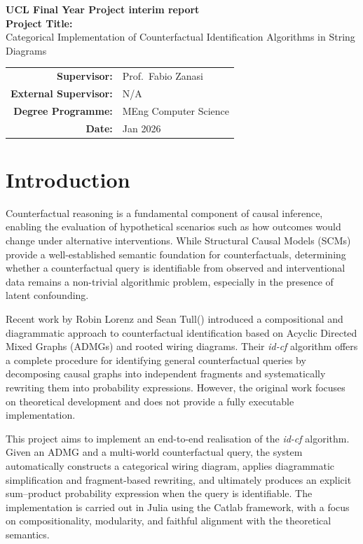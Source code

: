 \documentclass[12pt,a4paper]{article}
\begin{document}
\begin{center}
    \vspace*{1cm}
    {\LARGE \textbf{UCL Final Year Project interim report}}\\[1.5em]
    {\Large \textbf{Project Title:}}\\[0.5em]
    {\large Categorical Implementation of Counterfactual Identification Algorithms in String Diagrams}\\[2em]
    \begin{tabular}{rl}
        
        \textbf{Supervisor:} & Prof.\ Fabio Zanasi \\
        \textbf{External Supervisor:} & N/A \\
        \textbf{Degree Programme:} & MEng Computer Science \\
        \textbf{Date:} & Jan 2026 \\
    \end{tabular}
\end{center}


\newpage
\section{Introduction}

Counterfactual reasoning is a fundamental component of causal inference, enabling the evaluation of hypothetical scenarios such as how outcomes would change under alternative 
interventions. 
While Structural Causal Models (SCMs) provide a well-established semantic foundation for 
counterfactuals, determining whether a counterfactual query is identifiable from observed 
and interventional data remains a non-trivial algorithmic problem, especially in the 
presence of latent confounding.

Recent work by Robin Lorenz and Sean Tull(\cite{lorenz2023causal}) introduced a compositional and diagrammatic 
approach to counterfactual identification based on Acyclic Directed Mixed Graphs (ADMGs)
and rooted wiring diagrams. 
Their \textit{id-cf} algorithm offers a complete procedure for identifying general 
counterfactual queries by decomposing causal graphs into independent fragments and 
systematically rewriting them into probability expressions. 
However, the original work focuses on theoretical development and does not provide a 
fully executable implementation.

This project aims to implement an end-to-end realisation of the \textit{id-cf} algorithm. 
Given an ADMG and a multi-world counterfactual query, the system automatically constructs 
a categorical wiring diagram, applies diagrammatic simplification and fragment-based 
rewriting, and ultimately produces an explicit sum--product probability expression when 
the query is identifiable. 
The implementation is carried out in Julia using the Catlab framework, with a focus on 
compositionality, modularity, and faithful alignment with the theoretical semantics.
\end{document}
